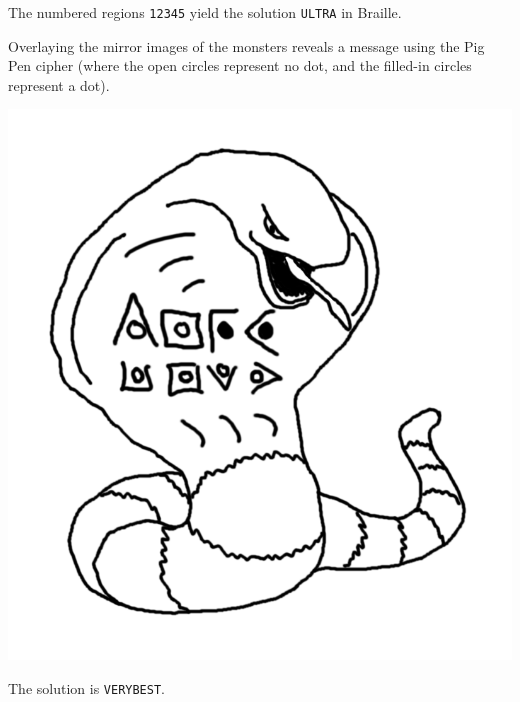 \begin{center}
{
}
\end{center}

The numbered regions \texttt{12345} yield the solution \texttt{ULTRA}
in Braille.


Overlaying the mirror images of the monsters reveals a message using
the Pig Pen cipher (where the open circles represent no dot, and the
filled-in circles represent a dot).

\begin{center}
\includegraphics[width=0.3\linewidth]{assets/not-arbok-solution.png}
\end{center}

The solution is \texttt{VERYBEST}.


